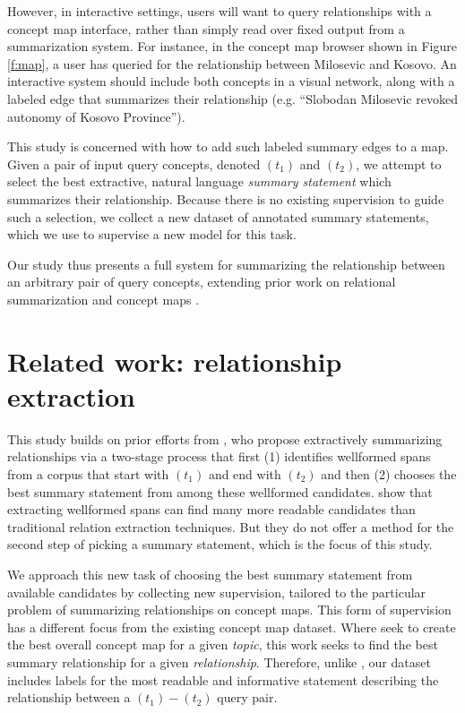 \documentclass[11pt,a4paper]{article}
\begin{document}
However, in interactive settings, users will want to query relationships with a concept map interface, rather than simply read over fixed output from a summarization system. For instance, in the concept map browser shown in Figure \ref{f:map}, a user has queried for the relationship between Milosevic and Kosovo. An interactive system should include both concepts in a visual network, along with a labeled edge that summarizes their relationship (e.g. ``Slobodan Milosevic revoked autonomy of Kosovo Province'').

This study is concerned with how to add such labeled summary edges to a map. Given a pair of input query concepts, denoted $(t_1)$ and $(t_2)$, we attempt to select the best extractive, natural language \textit{summary statement} which summarizes their relationship. Because there is no existing supervision to guide such a selection, we collect a new dataset of annotated summary statements, which we use to supervise a new model for this task. 

Our study thus presents a full system for summarizing the relationship between an arbitrary pair of query concepts, extending prior work on relational summarization and concept maps \cite{emnlp2017conceptmaps,N18-1159}. 
  

\section{Related work: relationship extraction}

This study builds on prior efforts from \citet{N18-1159}, who propose extractively summarizing relationships via a two-stage process that first (1) identifies wellformed spans from a corpus that start with $(t_1)$ and end with $(t_2)$ and then (2) chooses the best summary statement from among these wellformed candidates. \citet{N18-1159} show that extracting wellformed spans can find many more readable candidates than traditional relation extraction techniques. But they do not offer a method for the second step of picking a summary statement, which is the focus of this study.

We approach this new task of choosing the best summary statement from available candidates by collecting new supervision, tailored to the particular problem of summarizing relationships on concept maps. This form of supervision has a different focus from the existing \citet{emnlp2017conceptmaps} concept map dataset. Where \citet{emnlp2017conceptmaps} seek to create the best overall concept map for a given \textit{topic}, this work seeks to find the best summary relationship for a given \textit{relationship}. Therefore, unlike  \citet{emnlp2017conceptmaps}, our dataset includes labels for the most readable and informative statement describing the relationship between a $(t_1)-(t_2)$ query pair. 
\end{document}
